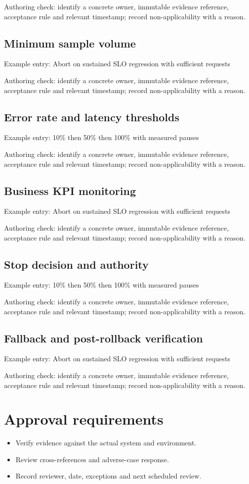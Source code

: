 \documentclass[10pt,letterpaper]{article}
\begin{document}
Authoring check: identify a concrete owner, immutable evidence reference, acceptance rule and relevant timestamp; record non-applicability with a reason.


\subsection{Minimum sample volume}
Example entry: Abort on sustained SLO regression with sufficient requests

Authoring check: identify a concrete owner, immutable evidence reference, acceptance rule and relevant timestamp; record non-applicability with a reason.


\subsection{Error rate and latency thresholds}
Example entry: 10\% then 50\% then 100\% with measured pauses

Authoring check: identify a concrete owner, immutable evidence reference, acceptance rule and relevant timestamp; record non-applicability with a reason.


\subsection{Business KPI monitoring}
Example entry: Abort on sustained SLO regression with sufficient requests

Authoring check: identify a concrete owner, immutable evidence reference, acceptance rule and relevant timestamp; record non-applicability with a reason.


\subsection{Stop decision and authority}
Example entry: 10\% then 50\% then 100\% with measured pauses

Authoring check: identify a concrete owner, immutable evidence reference, acceptance rule and relevant timestamp; record non-applicability with a reason.


\subsection{Fallback and post-rollback verification}
Example entry: Abort on sustained SLO regression with sufficient requests

Authoring check: identify a concrete owner, immutable evidence reference, acceptance rule and relevant timestamp; record non-applicability with a reason.


\section{Approval requirements}
\begin{itemize}
\item Verify evidence against the actual system and environment.
\item Review cross-references and adverse-case response.
\item Record reviewer, date, exceptions and next scheduled review.
\end{itemize}
\end{document}

